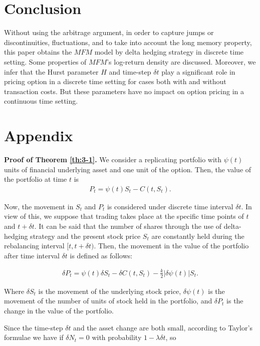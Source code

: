 \documentclass[a4paper,11pt]{amsart}
\numberwithin{equation}{section}
\theoremstyle{definition}
\theoremstyle{plain}
\theoremstyle{definition}
\newcommand{\1}{\mathbf{1}}
\begin{document}
\section{Conclusion}\label{sec:4}


Without using the arbitrage argument, in order to capture jumps or discontinuities, fluctuations,
and to take into account the long memory property, this paper obtains the $MFM$ model by delta hedging
strategy in discrete time setting.
Some properties of $MFM$'s log-return density are discussed. Moreover, we infer that the Hurst parameter $H$ and time-step $\delta t$ play a significant role in pricing option in a discrete time setting for cases both with and without transaction costs.
But these parameters have no impact on option pricing in a continuous time
setting.


\section*{Appendix}\label{appendix}
\textbf{Proof of Theorem \ref{th:3-1}.} We consider a replicating portfolio with $\psi(t)$ units of financial underlying asset and one unit of the option. Then, the value of the portfolio at time $t$ is
\begin{eqnarray}
P_t=\psi(t)S_t-C(t,S_t).
\label{eq:a1}
\end{eqnarray}


Now, the movement in $S_t$ and $P_t$ is considered under discrete time interval $\delta t$.
 In view of this, we suppose that trading takes place at the specific time points of $t$ and $t+\delta t$. It can be said that the number of shares through the use of delta-hedging strategy and the present stock price $S_t$ are constantly held during the rebalancing interval $[t,t+\delta t)$. Then, the movement in the value of the portfolio after time interval $\delta t$ is defined as follows:

\begin{eqnarray}
\delta P_t=\psi(t)\delta S_t-\delta C(t,S_t)-\frac{k}{2}|\delta\psi(t)|S_t.
\label{eq:a2}
\end{eqnarray}

Where $\delta S_t$ is the movement of the underlying stock price, $\delta \psi(t)$ is the movement of the number of units of  stock held in the portfolio, and $\delta P_t$ is the change in the value of the portfolio.

Since the time-step $\delta t$ and the asset change are both small, according to Taylor's formulae we have if $\delta N_t=0$ with probability $1-\lambda\delta t$, so
\end{document}
